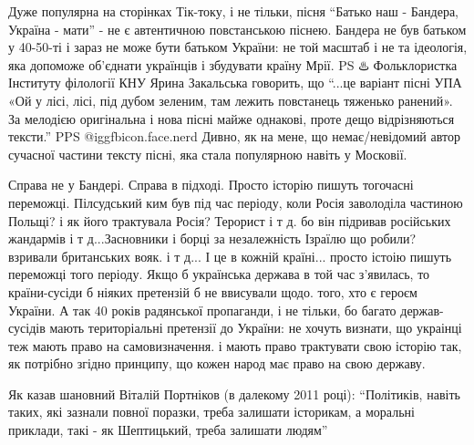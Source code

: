  
 
 
 
 
\zzSecCmt

\begin{itemize} %

Дуже популярна на сторінках Тік-току, і не тільки, пісня \enquote{Батько наш -
Бандера, Україна - мати} - не є автентичною повстанською піснею. Бандера не був
батьком у 40-50-ті і зараз не може бути батьком України: не той масштаб і не та
ідеологія, яка допоможе об'єднати українців і збудувати країну Мрії. PS ♨️
Фольклористка Інституту філології КНУ Ярина Закальська говорить, що
\enquote{...це варіант пісні УПА «Ой у лісі, лісі, під дубом зеленим, там
лежить повстанець тяженько ранений». За мелодією оригінальна і нова пісні майже
однакові, проте дещо відрізняються тексти.} PPS @igg{fbicon.face.nerd} Дивно,
як на мене, що немає/невідомий автор сучасної частини тексту пісні, яка стала
популярною навіть у Московії.


Справа не у Бандері. Справа в підході. Просто історію пишуть тогочасні
переможці. Пілсудський ким був під час періоду, коли Росія заволоділа частиною
Польщі? і як його трактувала Росія? Терорист і т д. бо він підривав російських
жандармів і т д...Засновники і борці за незалежність Ізраїлю що робили?
взривали британських вояк. і т д... І це в кожній країні... просто істоію
пишуть переможці того періоду. Якщо б українська держава в той час з'явилась,
то країни-сусіди б ніяких претензій б не ввисували щодо. того, хто є героєм
України. А так 40 років радянської пропаганди, і не тільки, бо багато
держав-сусідів мають територіальні претензії до України: не хочуть визнати, що
украінці теж мають право на самовизначення. і мають право трактувати свою
історію так, як потрібно згідно принципу, що кожен народ має право на свою
державу.


Як казав шановний Віталій Портніков (в далекому 2011 році): \enquote{Політиків, навіть
таких, які зазнали повної поразки, треба залишати історикам, а моральні
приклади, такі - як Шептицький, треба залишати людям}


\end{itemize}
